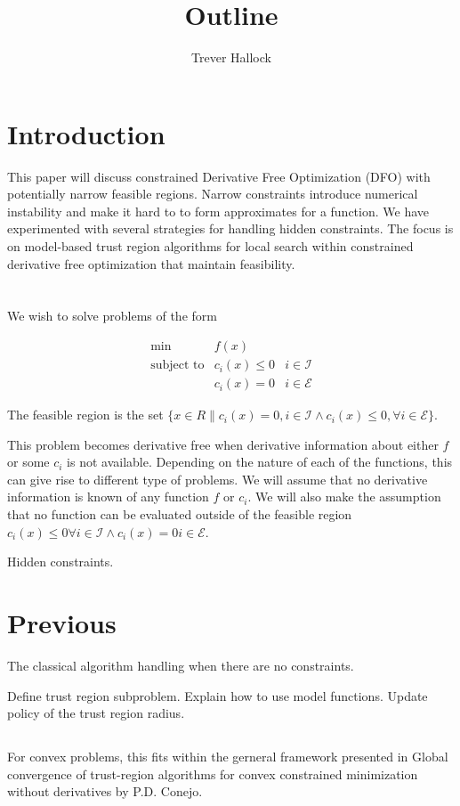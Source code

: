 \documentclass{article}
\author{Trever Hallock}
\title{Outline}
\begin{document}
\section{Introduction}

This paper will discuss constrained Derivative Free Optimization (DFO) with potentially narrow feasible regions.
Narrow constraints introduce numerical instability and make it hard to to form approximates for a function.
We have experimented with several strategies for handling hidden constraints.
The focus is on model-based trust region algorithms for local search within constrained derivative free optimization that maintain feasibility.



\section{}
We wish to solve problems of the form

\[ \begin{array}{ccl} \min & f(x) \\
\mbox{subject to} & c_i(x) \le 0 & i \in \mathcal{I} \\
& c_i(x) = 0 & i \in \mathcal{E}
\end{array}
\]

The feasible region is the set $\{x \in R \| c_i(x) = 0, i \in \mathcal{I} \wedge c_i(x) \le 0, \forall i \in \mathcal{E} \}$.


This problem becomes derivative free when derivative information about either $f$ or some $c_i$ is not available.
Depending on the nature of each of the functions, this can give rise to different type of problems.
We will assume that no derivative information is known of any function $f$ or $c_i$.
We will also make the assumption that no function can be evaluated outside of the feasible region $c_i(x) \le 0 \forall i \in \mathcal{I} \wedge c_i(x) = 0 i \in \mathcal{E}$.

Hidden constraints.


\section{Previous}
The classical algorithm handling when there are no constraints.


Define trust region subproblem.
Explain how to use model functions.
Update policy of the trust region radius.


\subsection{}
For convex problems, this fits within the gerneral framework presented in Global convergence of trust-region algorithms for convex constrained minimization without derivatives by P.D. Conejo.
\end{document}
